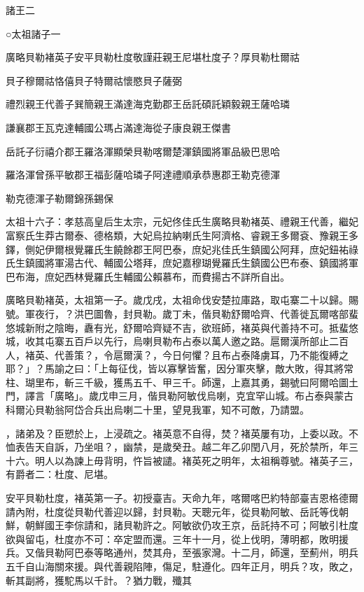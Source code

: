 
\begin{pinyinscope}
諸王二

○太祖諸子一

廣略貝勒褚英子安平貝勒杜度敬謹莊親王尼堪杜度子？厚貝勒杜爾祜

貝子穆爾祜恪僖貝子特爾祜懷愍貝子薩弼

禮烈親王代善子巽簡親王滿達海克勤郡王岳託碩託穎毅親王薩哈璘

謙襄郡王瓦克達輔國公瑪占滿達海從子康良親王傑書

岳託子衍禧介郡王羅洛渾顯榮貝勒喀爾楚渾鎮國將軍品級巴思哈

羅洛渾曾孫平敏郡王福彭薩哈璘子阿達禮順承恭惠郡王勒克德渾

勒克德渾子勒爾錦孫錫保

太祖十六子：孝慈高皇后生太宗，元妃佟佳氏生廣略貝勒褚英、禮親王代善，繼妃富察氏生莽古爾泰、德格類，大妃烏拉納喇氏生阿濟格、睿親王多爾袞、豫親王多鐸，側妃伊爾根覺羅氏生饒餘郡王阿巴泰，庶妃兆佳氏生鎮國公阿拜，庶妃鈕祐祿氏生鎮國將軍湯古代、輔國公塔拜，庶妃嘉穆瑚覺羅氏生鎮國公巴布泰、鎮國將軍巴布海，庶妃西林覺羅氏生輔國公賴慕布，而費揚古不詳所自出。

廣略貝勒褚英，太祖第一子。歲戊戌，太祖命伐安楚拉庫路，取屯寨二十以歸。賜號。軍夜行，？洪巴圖魯，封貝勒。歲丁未，偕貝勒舒爾哈齊、代善徙瓦爾喀部蜚悠城新附之陰晦，纛有光，舒爾哈齊疑不吉，欲班師，褚英與代善持不可。抵蜚悠城，收其屯寨五百戶以先行，烏喇貝勒布占泰以萬人邀之路。扈爾漢所部止二百人，褚英、代善策？，令扈爾漢？，今日何懼？且布占泰降虜耳，乃不能復縛之耶？」？馬諭之曰：「上每征伐，皆以寡擊皆奮，因分軍夾擊，敵大敗，得其將常柱、瑚里布，斬三千級，獲馬五千、甲三千。師還，上嘉其勇，錫號曰阿爾哈圖土門，譯言「廣略」。歲戊申三月，偕貝勒阿敏伐烏喇，克宜罕山城。布占泰與蒙古科爾沁貝勒翁阿岱合兵出烏喇二十里，望見我軍，知不可敵，乃請盟。

，諸弟及？臣愬於上，上浸疏之。褚英意不自得，焚？褚英屢有功，上委以政。不恤表告天自訴，乃坐咀？，幽禁，是歲癸丑。越二年乙卯閏八月，死於禁所，年三十六。明人以為諫上毋背明，忤旨被譴。褚英死之明年，太祖稱尊號。褚英子三，有爵者二：杜度、尼堪。

安平貝勒杜度，褚英第一子。初授臺吉。天命九年，喀爾喀巴約特部臺吉恩格德爾請內附，杜度從貝勒代善迎以歸，封貝勒。天聰元年，從貝勒阿敏、岳託等伐朝鮮，朝鮮國王李倧請和，諸貝勒許之。阿敏欲仍攻王京，岳託持不可；阿敏引杜度欲與留屯，杜度亦不可：卒定盟而還。三年十一月，從上伐明，薄明都，敗明援兵。又偕貝勒阿巴泰等略通州，焚其舟，至張家灣。十二月，師還，至薊州，明兵五千自山海關來援。與代善親陷陣，傷足，駐遵化。四年正月，明兵？攻，敗之，斬其副將，獲駝馬以千計。？猶力戰，殲其


\end{pinyinscope}
